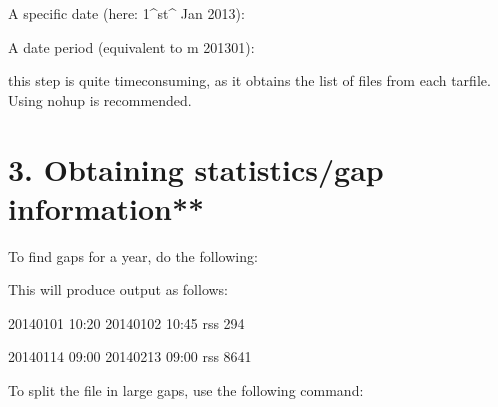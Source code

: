 \documentclass[letterpaper,10pt,english]{sphinxmanual}
\begin{document}
A specific date (here: 1\textasciicircum{}st\textasciicircum{} Jan 2013):


A date period (equivalent to \sphinxhyphen{}m 2013\sphinxhyphen{}01):


 this step is quite time\sphinxhyphen{}consuming, as it obtains the list of
files from each tarfile. Using nohup is recommended.


\section{3. Obtaining statistics/gap information**}
\label{\detokenize{filling_gaps:obtaining-statistics-gap-information}}
To find gaps for a year, do the following:


This will produce output as follows:

\begin{sphinxVerbatim}[commandchars=\\\{\}]
2014\PYGZhy{}01\PYGZhy{}01 10:20 2014\PYGZhy{}01\PYGZhy{}02 10:45 rss 294

2014\PYGZhy{}01\PYGZhy{}14 09:00 2014\PYGZhy{}02\PYGZhy{}13 09:00 rss 8641
\end{sphinxVerbatim}

To split the file in large gaps, use the following command:

\end{document}

